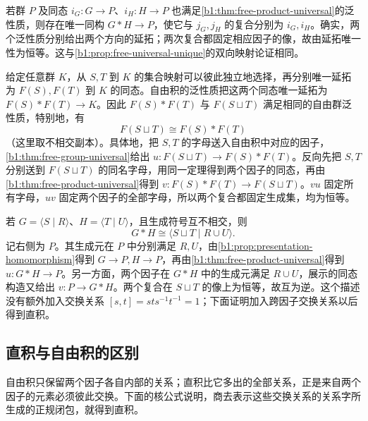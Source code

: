 \ProseParagraphBreak
若群 \(P\) 及同态 \(i_G:G\to P\)、\(i_H:H\to P\) 也满足\cref{b1:thm:free-product-universal}的泛性质，则存在唯一同构 \(G*H\to P\)，使它与 \(j_G,j_H\) 的复合分别为 \(i_G,i_H\)。确实，两个泛性质分别给出两个方向的延拓；两次复合都固定相应因子的像，故由延拓唯一性为恒等。这与\cref{b1:prop:free-universal-unique}的双向映射论证相同。

\ProseParagraphBreak
给定任意群 \(K\)，从 \(S,T\) 到 \(K\) 的集合映射可以彼此独立地选择，再分别唯一延拓为 \(F(S),F(T)\) 到 \(K\) 的同态。自由积的泛性质把这两个同态唯一延拓为 \(F(S)*F(T)\to K\)。因此 \(F(S)*F(T)\) 与 \(F(S\sqcup T)\) 满足相同的自由群泛性质，特别地，有
\[
	F(S\sqcup T)\cong F(S)*F(T)
\]
（这里取不相交副本）。具体地，把 \(S,T\) 的字母送入自由积中对应的因子，\cref{b1:thm:free-group-universal}给出 \(u:F(S\sqcup T)\to F(S)*F(T)\)。反向先把 \(S,T\) 分别送到 \(F(S\sqcup T)\) 的同名字母，用同一定理得到两个因子的同态，再由\cref{b1:thm:free-product-universal}得到 \(v:F(S)*F(T)\to F(S\sqcup T)\)。\(vu\) 固定所有字母，\(uv\) 固定两个因子的全部字母，所以两个复合都固定生成集，均为恒等。

\ProseParagraphBreak
若 \(G=\langle S\mid R\rangle\)、\(H=\langle T\mid U\rangle\)，且生成符号互不相交，则
\begin{equation}\label{b1:eq:free-product-presentation}
	G*H\cong\langle S\sqcup T\mid R\cup U\rangle.
\end{equation}
记右侧为 \(P\)。其生成元在 \(P\) 中分别满足 \(R,U\)，由\cref{b1:prop:presentation-homomorphism}得到 \(G\to P,H\to P\)，再由\cref{b1:thm:free-product-universal}得到 \(u:G*H\to P\)。另一方面，两个因子在 \(G*H\) 中的生成元满足 \(R\cup U\)，展示的同态构造又给出 \(v:P\to G*H\)。两个复合在 \(S\sqcup T\) 的像上为恒等，故互为逆。这个描述没有额外加入交换关系 \([s,t]=sts^{-1}t^{-1}=1\)；下面证明加入跨因子交换关系以后得到直积。

\subsection{直积与自由积的区别}
\label{b1:subsec:0803:03}

自由积只保留两个因子各自内部的关系；直积比它多出的全部关系，正是来自两个因子的元素必须彼此交换。下面的核公式说明，商去表示这些交换关系的关系字所生成的正规闭包，就得到直积。

